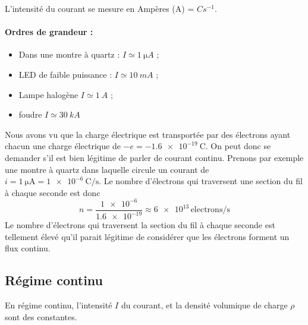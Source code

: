 \documentclass{cours}
\begin{document}
L'intensité du courant se mesure en Ampères (A) = $\si{C s^{-1}}$. 
\paragraph{Ordres de grandeur :}
\begin{itemize}
\item Dans une montre à quartz : $I\simeq \SI{1}{\micro A}$ ;
\item LED de faible puissance : $I\simeq \SI{10}{mA}$ ;
\item Lampe halogène $I\simeq \SI{1}{A}$ ;
\item foudre $I\simeq \SI{30}{kA}$
\end{itemize}

Nous avons vu que la charge électrique est transportée par des électrons ayant chacun une charge électrique de $-e=\SI{-1.6e-19}{\coulomb}$. On peut donc se demander s'il est bien légitime de parler de courant continu. Prenons par exemple une montre à quartz dans laquelle circule un courant de $i=\SI{1}{\micro\ampere} = \SI{1e-6}{\coulomb\per\second}$. Le nombre d'électrons qui traversent une section du fil à chaque seconde est donc 
\begin{equation}
  n=\frac{\num{1e-6}}{\num{1.6e-19}} \approx \num{6e13}\, \text{electrons/s}
\end{equation}
Le nombre d'électrons qui traversent la section du fil à chaque seconde est tellement élevé qu'il parait légitime de considérer que les électrons forment un flux continu.

\subsection{Régime continu}
En régime continu, l'intensité $I$ du courant, et la densité volumique de charge $\rho$ sont des constantes.

\begin{center}
\end{center}
\end{document}
